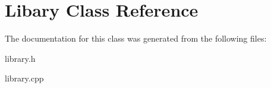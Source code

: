\hypertarget{class_libary}{}\section{Libary Class Reference}
\label{class_libary}


The documentation for this class was generated from the following files\+:\begin{DoxyCompactItemize}
\item 
library.\+h\item 
library.\+cpp\end{DoxyCompactItemize}
